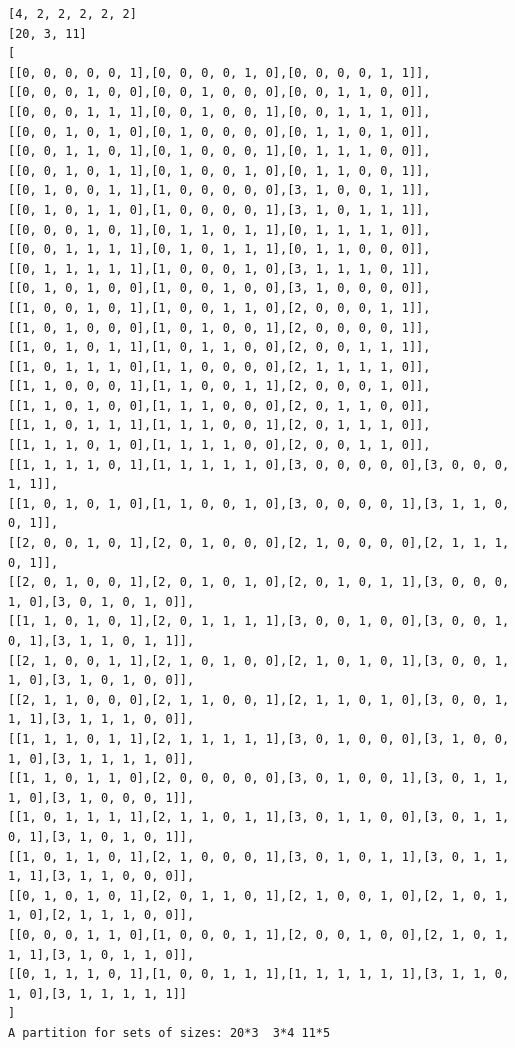 \documentclass[final]{dmtcs-episciences}
\begin{document}
\begin{appendices}
\begin{verbatim} 
[4, 2, 2, 2, 2, 2]
[20, 3, 11]
[
[[0, 0, 0, 0, 0, 1],[0, 0, 0, 0, 1, 0],[0, 0, 0, 0, 1, 1]],
[[0, 0, 0, 1, 0, 0],[0, 0, 1, 0, 0, 0],[0, 0, 1, 1, 0, 0]],
[[0, 0, 0, 1, 1, 1],[0, 0, 1, 0, 0, 1],[0, 0, 1, 1, 1, 0]],
[[0, 0, 1, 0, 1, 0],[0, 1, 0, 0, 0, 0],[0, 1, 1, 0, 1, 0]],
[[0, 0, 1, 1, 0, 1],[0, 1, 0, 0, 0, 1],[0, 1, 1, 1, 0, 0]],
[[0, 0, 1, 0, 1, 1],[0, 1, 0, 0, 1, 0],[0, 1, 1, 0, 0, 1]],
[[0, 1, 0, 0, 1, 1],[1, 0, 0, 0, 0, 0],[3, 1, 0, 0, 1, 1]],
[[0, 1, 0, 1, 1, 0],[1, 0, 0, 0, 0, 1],[3, 1, 0, 1, 1, 1]],
[[0, 0, 0, 1, 0, 1],[0, 1, 1, 0, 1, 1],[0, 1, 1, 1, 1, 0]],
[[0, 0, 1, 1, 1, 1],[0, 1, 0, 1, 1, 1],[0, 1, 1, 0, 0, 0]],
[[0, 1, 1, 1, 1, 1],[1, 0, 0, 0, 1, 0],[3, 1, 1, 1, 0, 1]],
[[0, 1, 0, 1, 0, 0],[1, 0, 0, 1, 0, 0],[3, 1, 0, 0, 0, 0]],
[[1, 0, 0, 1, 0, 1],[1, 0, 0, 1, 1, 0],[2, 0, 0, 0, 1, 1]],
[[1, 0, 1, 0, 0, 0],[1, 0, 1, 0, 0, 1],[2, 0, 0, 0, 0, 1]],
[[1, 0, 1, 0, 1, 1],[1, 0, 1, 1, 0, 0],[2, 0, 0, 1, 1, 1]],
[[1, 0, 1, 1, 1, 0],[1, 1, 0, 0, 0, 0],[2, 1, 1, 1, 1, 0]],
[[1, 1, 0, 0, 0, 1],[1, 1, 0, 0, 1, 1],[2, 0, 0, 0, 1, 0]],
[[1, 1, 0, 1, 0, 0],[1, 1, 1, 0, 0, 0],[2, 0, 1, 1, 0, 0]],
[[1, 1, 0, 1, 1, 1],[1, 1, 1, 0, 0, 1],[2, 0, 1, 1, 1, 0]],
[[1, 1, 1, 0, 1, 0],[1, 1, 1, 1, 0, 0],[2, 0, 0, 1, 1, 0]],
[[1, 1, 1, 1, 0, 1],[1, 1, 1, 1, 1, 0],[3, 0, 0, 0, 0, 0],[3, 0, 0, 0, 1, 1]],
[[1, 0, 1, 0, 1, 0],[1, 1, 0, 0, 1, 0],[3, 0, 0, 0, 0, 1],[3, 1, 1, 0, 0, 1]],
[[2, 0, 0, 1, 0, 1],[2, 0, 1, 0, 0, 0],[2, 1, 0, 0, 0, 0],[2, 1, 1, 1, 0, 1]],
[[2, 0, 1, 0, 0, 1],[2, 0, 1, 0, 1, 0],[2, 0, 1, 0, 1, 1],[3, 0, 0, 0, 1, 0],[3, 0, 1, 0, 1, 0]],
[[1, 1, 0, 1, 0, 1],[2, 0, 1, 1, 1, 1],[3, 0, 0, 1, 0, 0],[3, 0, 0, 1, 0, 1],[3, 1, 1, 0, 1, 1]],
[[2, 1, 0, 0, 1, 1],[2, 1, 0, 1, 0, 0],[2, 1, 0, 1, 0, 1],[3, 0, 0, 1, 1, 0],[3, 1, 0, 1, 0, 0]],
[[2, 1, 1, 0, 0, 0],[2, 1, 1, 0, 0, 1],[2, 1, 1, 0, 1, 0],[3, 0, 0, 1, 1, 1],[3, 1, 1, 1, 0, 0]],
[[1, 1, 1, 0, 1, 1],[2, 1, 1, 1, 1, 1],[3, 0, 1, 0, 0, 0],[3, 1, 0, 0, 1, 0],[3, 1, 1, 1, 1, 0]],
[[1, 1, 0, 1, 1, 0],[2, 0, 0, 0, 0, 0],[3, 0, 1, 0, 0, 1],[3, 0, 1, 1, 1, 0],[3, 1, 0, 0, 0, 1]],
[[1, 0, 1, 1, 1, 1],[2, 1, 1, 0, 1, 1],[3, 0, 1, 1, 0, 0],[3, 0, 1, 1, 0, 1],[3, 1, 0, 1, 0, 1]],
[[1, 0, 1, 1, 0, 1],[2, 1, 0, 0, 0, 1],[3, 0, 1, 0, 1, 1],[3, 0, 1, 1, 1, 1],[3, 1, 1, 0, 0, 0]],
[[0, 1, 0, 1, 0, 1],[2, 0, 1, 1, 0, 1],[2, 1, 0, 0, 1, 0],[2, 1, 0, 1, 1, 0],[2, 1, 1, 1, 0, 0]],
[[0, 0, 0, 1, 1, 0],[1, 0, 0, 0, 1, 1],[2, 0, 0, 1, 0, 0],[2, 1, 0, 1, 1, 1],[3, 1, 0, 1, 1, 0]],
[[0, 1, 1, 1, 0, 1],[1, 0, 0, 1, 1, 1],[1, 1, 1, 1, 1, 1],[3, 1, 1, 0, 1, 0],[3, 1, 1, 1, 1, 1]]
]
A partition for sets of sizes: 20*3  3*4 11*5
\end{verbatim}
\newpage


\end{appendices}
\end{document}
